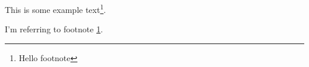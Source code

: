 \documentclass{article}
\begin{document}
This is some example text\footnote{\label{myfootnote}Hello footnote}.

\newpage

I'm referring to footnote \ref{myfootnote}.
\end{document}
